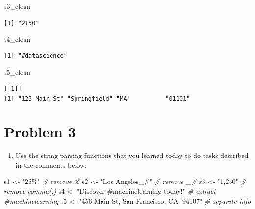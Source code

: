 \documentclass[
]{book}
\newenvironment{Shaded}{\begin{snugshade}}{\end{snugshade}}
\newcommand{\CommentTok}[1]{\textcolor[rgb]{0.56,0.35,0.01}{\textit{#1}}}
\newcommand{\NormalTok}[1]{#1}
\newcommand{\OtherTok}[1]{\textcolor[rgb]{0.56,0.35,0.01}{#1}}
\newcommand{\StringTok}[1]{\textcolor[rgb]{0.31,0.60,0.02}{#1}}
\providecommand{\tightlist}{%
  \setlength{\itemsep}{0pt}\setlength{\parskip}{0pt}}
\begin{document}
\begin{Shaded}
\begin{Highlighting}[]
\NormalTok{s3\_clean}
\end{Highlighting}
\end{Shaded}

\begin{verbatim}
[1] "2150"
\end{verbatim}

\begin{Shaded}
\begin{Highlighting}[]
\NormalTok{s4\_clean}
\end{Highlighting}
\end{Shaded}

\begin{verbatim}
[1] "#datascience"
\end{verbatim}

\begin{Shaded}
\begin{Highlighting}[]
\NormalTok{s5\_clean}
\end{Highlighting}
\end{Shaded}

\begin{verbatim}
[[1]]
[1] "123 Main St" "Springfield" "MA"          "01101"      
\end{verbatim}

\hypertarget{problem-3}{%
\section{Problem 3}\label{problem-3}}

\begin{enumerate}
\def\labelenumi{\alph{enumi}.}
\tightlist
\item
  Use the string parsing functions that you learned today to do tasks described in the comments below:
\end{enumerate}

\begin{Shaded}
\begin{Highlighting}[]
\NormalTok{s1 }\OtherTok{\textless{}{-}} \StringTok{"25\%"}  \CommentTok{\# remove \%}
\NormalTok{s2 }\OtherTok{\textless{}{-}} \StringTok{"Los Angeles\_\#"}  \CommentTok{\# remove \_\#}
\NormalTok{s3 }\OtherTok{\textless{}{-}} \StringTok{"1,250"}    \CommentTok{\# remove comma(,)}
\NormalTok{s4 }\OtherTok{\textless{}{-}} \StringTok{"Discover \#machinelearning today!"}   \CommentTok{\# extract \#machinelearning}
\NormalTok{s5 }\OtherTok{\textless{}{-}} \StringTok{"456 Main St, San Francisco, CA, 94107"}   \CommentTok{\# separate info}
\end{Highlighting}
\end{Shaded}
\end{document}

